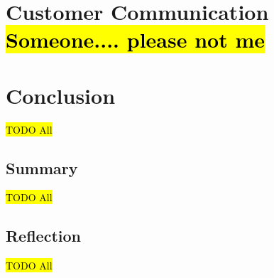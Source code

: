 \documentclass[10pt,a4paper]{article}
\begin{document}
\section{Customer Communication \hl{Someone.... please not me}}
\label{sec:customer_comms}

\section{Conclusion}
\label{sec:conclusion}
\hl{TODO All}

\subsection{Summary}
\label{sec:summary}
\hl{TODO All}

\subsection{Reflection}
\label{sec:reflection}
\hl{TODO All}



\end{document}
